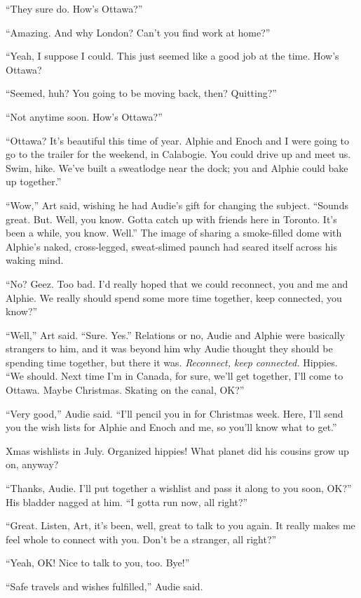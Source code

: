 “They sure do. How’s Ottawa?”

“Amazing. And why London? Can’t you find work at home?”

“Yeah, I suppose I could. This just seemed like a good job at the
time. How’s Ottawa?

“Seemed, huh? You going to be moving back, then? Quitting?”

“Not anytime soon. How’s Ottawa?”

“Ottawa? It’s beautiful this time of year. Alphie and Enoch and I
were going to go to the trailer for the weekend, in Calabogie. You
could drive up and meet us. Swim, hike. We’ve built a sweatlodge
near the dock; you and Alphie could bake up together.”

“Wow,” Art said, wishing he had Audie’s gift for changing the
subject. “Sounds great. But. Well, you know. Gotta catch up with
friends here in Toronto. It’s been a while, you know. Well.” The
image of sharing a smoke-filled dome with Alphie’s naked,
cross-legged, sweat-slimed paunch had seared itself across his
waking mind.

“No? Geez. Too bad. I’d really hoped that we could reconnect, you
and me and Alphie. We really should spend some more time together,
keep connected, you know?”

“Well,” Art said. “Sure. Yes.” Relations or no, Audie and Alphie
were basically strangers to him, and it was beyond him why Audie
thought they should be spending time together, but there it was.
\emph{Reconnect, keep connected.} Hippies. “We should. Next time
I’m in Canada, for sure, we’ll get together, I’ll come to Ottawa.
Maybe Christmas. Skating on the canal, OK?”

“Very good,” Audie said. “I’ll pencil you in for Christmas week.
Here, I’ll send you the wish lists for Alphie and Enoch and me, so
you’ll know what to get.”

Xmas wishlists in July. Organized hippies! What planet did his
cousins grow up on, anyway?

“Thanks, Audie. I’ll put together a wishlist and pass it along to
you soon, OK?” His bladder nagged at him. “I gotta run now, all
right?”

“Great. Listen, Art, it’s been, well, great to talk to you again.
It really makes me feel whole to connect with you. Don’t be a
stranger, all right?”

“Yeah, OK! Nice to talk to you, too. Bye!”

“Safe travels and wishes fulfilled,” Audie said.


